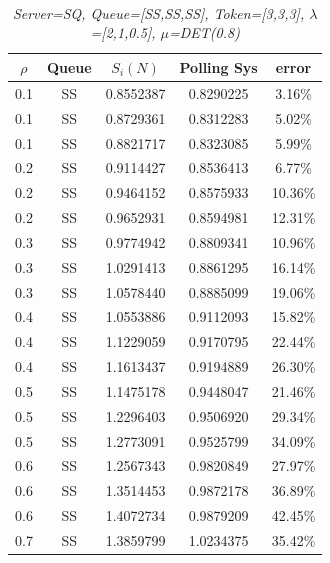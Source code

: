 \documentclass[12pt,a4paper,italian]{article}
\begin{document}
\begin{table}[h!]
\begin{minipage}[b]{0.48\linewidth}
\begin{tabular}{c c c c c}
		
		\end{tabular}
		
	\end{minipage}
\end{table}
\ \ \ \\
\\
\ \
\vfill
\newpage
\begin{table}[ht!]
	\begin{minipage}[b]{0.48\linewidth}\centering
		\centering
		\caption{\scriptsize \emph{Server=SQ, Queue=[SS,SS,SS], Token=[3,3,3], $\lambda$=[2,1,0.5], $\mu$=DET(0.8) }}
		\label{tab7}
		\tiny
		\begin{tabular}{c c c c c}
			\hline
			$\rho$ & Queue & $S_i(N)$ & Polling Sys & error \\ \hline
		 0.1 & SS & 0.8552387 &   0.8290225    & 3.16\% \\
		 0.1 & SS & 0.8729361 &   0.8312283    & 5.02\% \\
		 0.1 & SS & 0.8821717 &   0.8323085    & 5.99\% \\ \hline \hline
		 0.2 & SS & 0.9114427 &   0.8536413    & 6.77\% \\
		 0.2 & SS & 0.9464152 &   0.8575933    & 10.36\% \\
		 0.2 & SS & 0.9652931 &   0.8594981    & 12.31\% \\ \hline \hline
		 0.3 & SS & 0.9774942 &   0.8809341    & 10.96\% \\
		 0.3 & SS & 1.0291413 &   0.8861295    & 16.14\% \\
		 0.3 & SS & 1.0578440 &   0.8885099    & 19.06\% \\ \hline \hline
		 0.4 & SS & 1.0553886 &   0.9112093    & 15.82\% \\
		 0.4 & SS & 1.1229059 &   0.9170795    & 22.44\% \\
		 0.4 & SS & 1.1613437 &   0.9194889    & 26.30\% \\ \hline \hline
		 0.5 & SS & 1.1475178 &   0.9448047    & 21.46\% \\
		 0.5 & SS & 1.2296403 &   0.9506920    & 29.34\% \\
		 0.5 & SS & 1.2773091 &   0.9525799    & 34.09\% \\ \hline \hline
		 0.6 & SS & 1.2567343 &   0.9820849    & 27.97\% \\
		 0.6 & SS & 1.3514453 &   0.9872178    & 36.89\% \\
		 0.6 & SS & 1.4072734 &   0.9879209    & 42.45\% \\ \hline \hline
		 0.7 & SS & 1.3859799 &   1.0234375    & 35.42\% \\

\end{tabular}
\end{minipage}
\end{table}
\end{document}
